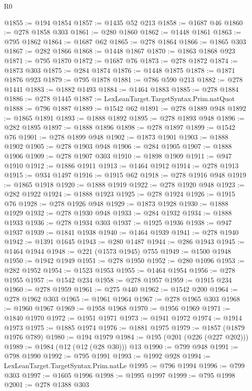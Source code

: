 \begin{lexlean}{R0}
\begin{coremodule}
@1855 := @194 @1854
@1857 := @1435 @52 @213
@1858 := @1687 @46
@1860 := @278 @1858 @303
@1861 := @280 @1860
@1862 := @1448 @1861
@1863 := @795 @1862
@1864 := @1687 @62
@1865 := @278 @1864
@1866 := @1865 @303
@1867 := @282 @1866
@1868 := @1448 @1867
@1870 := @1863 @1868 @923
@1871 := @795 @1870
@1872 := @1687 @76
@1873 := @278 @1872
@1874 := @1873 @303
@1875 := @284 @1874
@1876 := @1448 @1875
@1878 := @1871 @1876 @923
@1879 := @795 @1878
@1881 := @786 @590 @213
@1882 := @278 @1441
@1883 := @1882 @1493
@1884 := @1464 @1883
@1885 := @278 @1884
@1886 := @278 @1445
@1887 := LexLeanTarget.TargetSyntax.Prim.natQuot
@1888 := @796 @1887
@1889 := @1542 @62
@1891 := @278 @1889 @948
@1892 := @1865 @1891
@1893 := @1888 @1892
@1895 := @278 @1893 @948
@1896 := @282 @1895
@1897 := @1888 @1896
@1898 := @278 @1897
@1899 := @1542 @76
@1901 := @278 @1899 @948
@1902 := @1873 @1901
@1903 := @1888 @1902
@1905 := @278 @1903 @948
@1906 := @284 @1905
@1907 := @1888 @1906
@1909 := @278 @1907 @303
@1910 := @1898 @1909
@1911 := @947 @1910
@1912 := @1886 @1911
@1913 := @1464 @1912
@1914 := @278 @1913
@1915 := @934 @1497
@1916 := @1915 @62
@1918 := @278 @1916 @948
@1919 := @1865 @1918
@1920 := @1888 @1919
@1922 := @278 @1920 @948
@1923 := @282 @1922
@1924 := @1888 @1923
@1925 := @278 @1924
@1926 := @1915 @76
@1928 := @278 @1926 @948
@1929 := @1873 @1928
@1930 := @1888 @1929
@1932 := @278 @1930 @948
@1933 := @284 @1932
@1934 := @1888 @1933
@1936 := @278 @1934 @303
@1937 := @1925 @1936
@1938 := @947 @1937
@1939 := @1841 @1938
@1940 := @1464 @1939
@1941 := @278 @1940
@1942 := @1391 @1645
@1943 := @280 @1487
@1944 := @286 @1943
@1945 := @1464 @1944
@1948 := @221 (@1573 @1945) @755
@1949 := @1500 @1948
@1950 := @1942 @1949
@1951 := @278 @1950
@1952 := @280 @1096
@1953 := @282 @1952
@1954 := @1523 @1953
@1955 := @1464 @1954
@1956 := @278 @1955
@1957 := @1542 @234
@1958 := @278 @1957
@1959 := @1915 @234
@1960 := @278 @1959
@1961 := @275 @440
@1962 := @1542 @200
@1964 := @278 @1962 @303
@1965 := @1961 @1964
@1967 := @278 @1965 @303
@1968 := @1960 @1967
@1969 := @1958 @1968
@1970 := @1956 @1969
@1971 := @1840 @1970
@1972 := @1951 @1971
@1973 := @1941 @1972
@1974 := @1914 @1973
@1975 := @1885 @1974
@1976 := @1881 @1975
@1979 := @1857 (@1879 @1976 @789)
@1980 := @194 @1979
@1984 := @195 (@201 (@226 (@227 @202)))
@1989 := @1984 (@12 (@12 (@28 @30))) @13
@1990 := @799 @948
@1991 := @798 @1990
@1992 := @795 @1991
@1993 := @1992 @928
@1994 := LexLeanTarget.TargetSyntax.Prim.natLe
@1995 := @796 @1994
@1996 := @799 @303
@1997 := @1605 @1996
@1998 := @1995 @1997
@1999 := @795 @1998
@2001 := @278 @1388 @303

\end{coremodule}
\end{lexlean}
